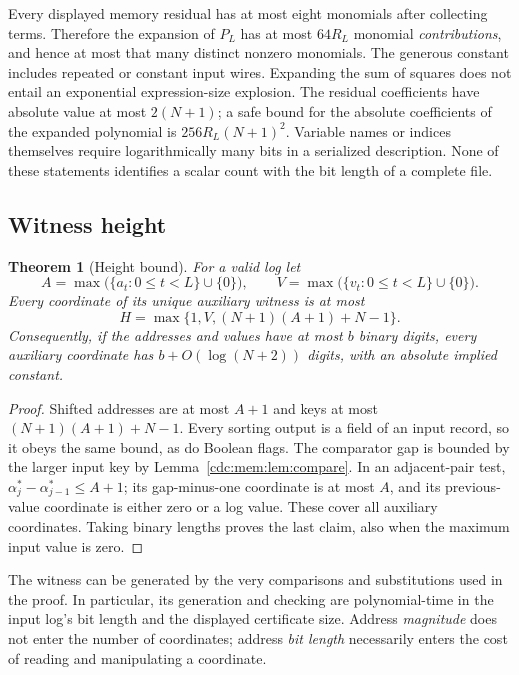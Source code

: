 \documentclass[11pt,a4paper]{article}
\newtheorem{theorem}{Theorem}[section]
\theoremstyle{definition}
\theoremstyle{remark}
\begin{document}
Every displayed memory residual has at most eight monomials after collecting
terms. Therefore the expansion of $P_L$ has at most $64R_L$ monomial
\emph{contributions}, and hence at most that many distinct nonzero monomials.
The generous constant includes repeated or constant input wires. Expanding the
sum of squares does not entail an exponential expression-size explosion.
The residual coefficients have absolute value at most $2(N+1)$; a safe bound for
the absolute coefficients of the expanded polynomial is
$256R_L(N+1)^2$. Variable names or indices themselves require logarithmically
many bits in a serialized description. None of these statements identifies a
scalar count with the bit length of a complete file.

\subsection{Witness height}
\begin{theorem}[Height bound]\label{cdc:mem:thm:height}
For a valid log let
\[
 A=\max\bigl(\{a_t:0\leq t<L\}\cup\{0\}\bigr),\qquad
 V=\max\bigl(\{v_t:0\leq t<L\}\cup\{0\}\bigr).
\]
Every coordinate of its unique auxiliary witness is at most
\begin{equation}\label{cdc:mem:eq:height}
 H=\max\{1,V,(N+1)(A+1)+N-1\}.
\end{equation}
Consequently, if the addresses and values have at most $b$ binary digits, every
auxiliary coordinate has $b+O(\log(N+2))$ digits, with an absolute implied
constant.
\end{theorem}
\begin{proof}
Shifted addresses are at most $A+1$ and keys at most
$(N+1)(A+1)+N-1$. Every sorting output is a field of an input record, so it
obeys the same bound, as do Boolean flags. The comparator gap is bounded by
the larger input key by Lemma~\ref{cdc:mem:lem:compare}. In an adjacent-pair test,
$\alpha_j^*-\alpha_{j-1}^*\leq A+1$; its gap-minus-one coordinate is at most
$A$, and its previous-value coordinate is either zero or a log value.
These cover all auxiliary coordinates. Taking binary lengths proves the last
claim, also when the maximum input value is zero.
\end{proof}

The witness can be generated by the very comparisons and substitutions used
in the proof. In particular, its generation and checking are polynomial-time
in the input log's bit length and the displayed certificate size. Address
\emph{magnitude} does not enter the number of coordinates; address \emph{bit
length} necessarily enters the cost of reading and manipulating a coordinate.
\end{document}
